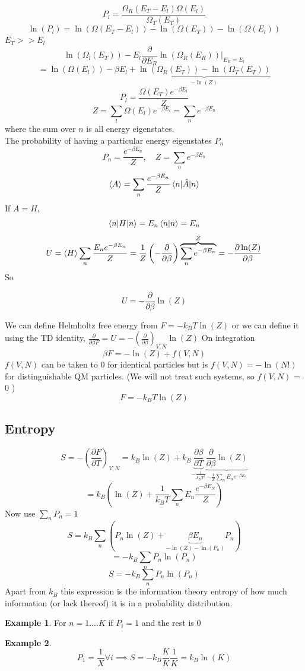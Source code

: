 \documentclass[11pt]{book}
\theoremstyle{definition}
\newtheorem{example}{Example}[section]
\begin{document}
\[ P_l = \frac{\Omega_R(E_T-E_l) \Omega(E_l)}{\Omega_T(E_T)} \]
\[ \ln(P_l) = \ln(\Omega(E_T-E_l)) - \ln(\Omega(E_T)) - \ln(\Omega(E_l))   \] 
$ E_T >> E_l $ 
\[ \ln(\Omega_l(E_T)) - 
E_l \frac{\partial }{\partial E_R} \ln(\Omega_R(E_R)) \vert_{E_R=E_l}\]
\[ = \ln(\Omega(E_l)) -\beta E_l + 
\underbrace{\ln(\Omega_R(E_T)) - \ln(\Omega_T(E_T))}_{-\ln(Z) }    \] 
\[ P_l = \frac{\Omega(E_T)e^{-\beta E_l}}{Z} \] 
\[ Z = \sum_l \Omega(E_l)e^{-\beta E_l} = \sum_n e^{-\beta E_n}\] 
where the sum over $n$ is all energy eigenstates. \\
The probability of having a particular energy eigenstates $ P_n $ 
\[ P_n = \frac{e^{-\beta E_n}}{Z}, \quad  Z = \sum_n e^{-\beta E_n}\] 
\[ \langle A \rangle = \sum_n \frac{e^{-\beta E_n}}{Z} \braket{n|\hat A|n} \] 
If $ A = H $,
\[ \braket{n|H|n} = E_n \braket{n|n} = E_n \] 
\[ U = \braket{H} \sum_n \frac{E_n e^{-\beta E_n}}{Z} = \frac{1}{Z} \left( -\frac{\partial }{\partial \beta}  \right) 
\overbrace{\sum_n e^{-\beta E_n}}^{Z} 
= - \frac{\partial \ln(Z) }{\partial \beta} \] 
So
\begin{shaded*}

\[ U = -\frac{\partial }{\partial \beta} \ln(Z)  \] 

\end{shaded*}

We can define Helmholtz free energy from $ F = -k_BT\ln(Z) $ or we can define it using the TD identity, $ \frac{\partial }{\partial \beta F}= U = -\left(\frac{\partial }{\partial \beta}\right)_{V,N} \ln(Z)  $
On integration
\[ \beta F =  -\ln(Z) + f(V,N)  \] 
$ f(V,N) $ can be taken to $ 0 $ for identical particles but is $ f(V,N) = -\ln(N!)  $ for distinguishable QM particles. 
(We will not treat such systems, so $ f(V,N) $ = 0 )
\[ F = -k_BT\ln(Z)  \] 
\subsection{Entropy}
\[ S = -\left( \frac{\partial F}{\partial T} \right)_{V,N} = k_B\ln(Z) +k_B 
\underbrace{\frac{\partial \beta}{\partial T}}_{-\frac{1}{k_BT^2}}
\underbrace{\frac{\partial }{\partial \beta} \ln(Z)}_{-\frac{1}{Z}\sum_n E_n e^{-\beta E_n}} \] 
\[  =k_B \left( \ln(Z) + \frac{1}{k_BT} \sum_n E_n \frac{e^{-\beta E_N}}{Z} \right)  \] 
Now use $ \sum_n P_n =1 $ 
\[ S = k_B \sum_n(P_n\ln(Z) +\underbrace{\beta E_n}_{-\ln(Z)-\ln(P_n)  } P_n) \] 
\[ = -k_B \sum_n P_n \ln(P_n)  \] 
\[ S = -k_B\sum_n P_n \ln(P_n)  \] 
Apart from $ k_B $ this expression is the information theory entropy of how much information (or lack thereof) it is in a probability distribution.
\begin{example}
	For $ n=1 ....K $ if $ P_i = 1 $ and the rest is 0
\end{example}
\begin{example}
	\[ P_1 = \frac{1}{X} \forall i \implies S = -k_B \frac{K}{K}\frac{1}{K} = k_B \ln(K) \]
\end{example}
\end{document}

